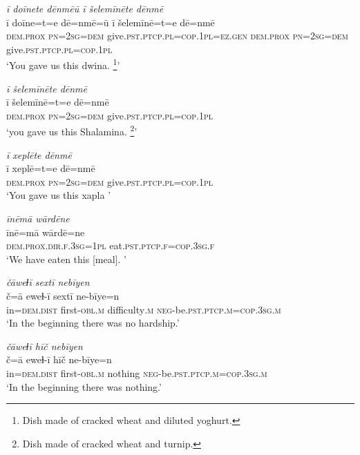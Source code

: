 \ea \label{ŽE.50}
\textit{ī doīnete dēnmēū ī šelemīnēte dēnmē} \\ 
\gll ī doīne=t=e dē=nmē=ū ī šelemīnē=t=e dē=nmē \\ 
 \textsc{dem.prox} \textsc{pn}\textsc{=\textsc{2sg}}\textsc{=dem} give\textsc{.pst}\textsc{.ptcp}\textsc{.pl}\textsc{=cop}\textsc{.1pl}\textsc{\textsc{=ez.gen}} \textsc{dem.prox} \textsc{pn}\textsc{=\textsc{2sg}}\textsc{=dem} give\textsc{.pst}\textsc{.ptcp}\textsc{.pl}\textsc{=cop}\textsc{.1pl} \\ 
\glt `You gave us this dwina. \footnote{Dish made of cracked wheat and diluted yoghurt.}'
\z 
 
\ea \label{ŽE.51}
\textit{ī šelemīnēte dēnmē} \\ 
\gll ī šelemīnē=t=e dē=nmē \\ 
 \textsc{dem.prox} \textsc{pn}\textsc{=\textsc{2sg}}\textsc{=dem} give\textsc{.pst}\textsc{.ptcp}\textsc{.pl}\textsc{=cop}\textsc{.1pl} \\ 
\glt `you gave us this Shalamina. \footnote{Dish made of cracked wheat and turnip.}'
\z 
 
\ea \label{ŽE.52}
\textit{ī xeplēte dēnmē} \\ 
\gll ī xeplē=t=e dē=nmē \\ 
 \textsc{dem.prox} \textsc{pn}\textsc{=\textsc{2sg}}\textsc{=dem} give\textsc{.pst}\textsc{.ptcp}\textsc{.pl}\textsc{=cop}\textsc{.1pl} \\ 
\glt `You gave us this xapla '
\z 
 
\ea \label{ŽE.53}
\textit{īnēmā wārdēne} \\ 
\gll īnē=mā wārdē=ne \\ 
 \textsc{dem.prox}\textsc{.dir}\textsc{.f}\textsc{.3sg}\textsc{=1pl} eat\textsc{.pst}\textsc{.ptcp}\textsc{.f}\textsc{=cop}\textsc{.3sg}\textsc{.f} \\ 
\glt `We have eaten this [meal]. '
\z 
 
\ea \label{ŽE.56}
\textit{čāweɫī sextī nebīyen} \\ 
\gll č=ā eweɫ-ī sextī ne-bīye=n \\ 
 in=\textsc{dem.dist} first\textsc{-obl}\textsc{.m} difficulty\textsc{.m} \textsc{neg-}be\textsc{.pst}\textsc{.ptcp}\textsc{.m}\textsc{=cop}\textsc{.3sg}\textsc{.m} \\ 
\glt `In the beginning there was no hardship.'
\z 
 
\ea \label{ŽE.57}
\textit{čāweɫī hīč nebīyen} \\ 
\gll č=ā eweɫ-ī hīč ne-bīye=n \\ 
 in=\textsc{dem.dist} first\textsc{-obl}\textsc{.m} nothing \textsc{neg-}be\textsc{.pst}\textsc{.ptcp}\textsc{.m}\textsc{=cop}\textsc{.3sg}\textsc{.m} \\ 
\glt `In the beginning there was nothing.'
\z 
 
